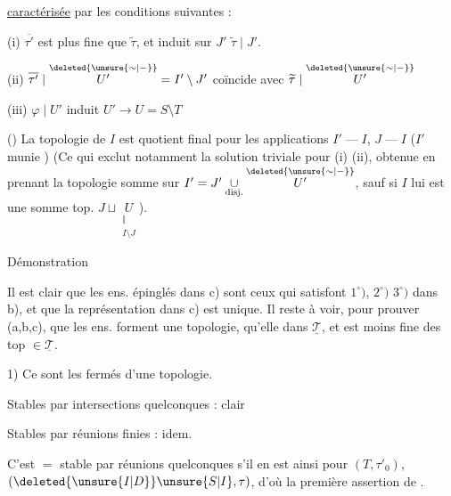 \uline{caractérisée} par les conditions suivantes :

(i) $\overline{\tau'}$ est plus fine que $\widetilde{\tau}$, et induit sur $J'$ $\widetilde{\tau}\mid J'$.

(ii) $\overline{\tau'}\mid\overset{\deleted{\unsure{\sim|\mathord{-}}}}{U'}=I'\setminus J'$ coïncide avec $\widetilde{\tau}\mid\overset{\deleted{\unsure{\sim|\mathord{-}}}}{U'}$

(iii) $\varphi\mid U'$ induit   $U'\longrightarrow U=S\setminus T$

() La topologie de $I$ est quotient final pour les applications $I'\mathbin{\text{---}}I$, $J\mathbin{\text{---}}I$ ($I'$ munie  ) (Ce qui exclut notamment la solution triviale pour (i) (ii), obtenue en prenant la topologie somme sur  $I'=J'\underset{\text{disj.}}{\cup}\overset{\deleted{\unsure{\sim|\mathord{-}}}}{U'}$, sauf si $I$ lui est une somme top. $J\sqcup\underset{\substack{\Vert\\I\setminus J}}{U}$).

Démonstration

  Il est clair que les ens. épinglés dans c) sont ceux qui satisfont $1^\circ)$, $2^\circ)$ $3^\circ)$ dans b), et que la représentation dans c) est unique. Il reste à voir, pour prouver (a,b,c), que les ens. forment une topologie,  qu'elle   dans $\underline{\mathscr{T}}$, et est moins fine des top $\in\underline{\mathscr{T}}$.

1) Ce sont les fermés d'une topologie.

Stables par intersections quelconques : clair

Stables par réunions finies : idem.

C'est $=$ stable par réunions quelconques s'il en est ainsi pour $(T,\tau'_0)$, $(\deleted{\unsure{I|D}}\unsure{S|I},\tau)$, d'où la première assertion de .
